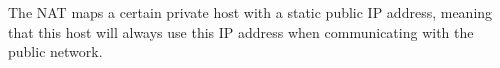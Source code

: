 The NAT maps a certain private host with a static public IP address, meaning that this host will always use this IP address when communicating with the public network.
